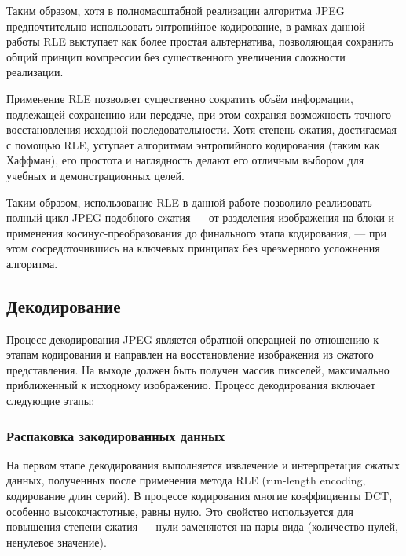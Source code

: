 Таким образом, хотя в полномасштабной реализации алгоритма JPEG предпочтительно использовать энтропийное кодирование, 
в рамках данной работы RLE выступает как более простая альтернатива, 
позволяющая сохранить общий принцип компрессии без существенного увеличения сложности реализации.


\begin{RLETable}
\end{RLETable}


\begin{RLEEncodedTable}
\end{RLEEncodedTable}


Применение RLE позволяет существенно сократить объём информации, подлежащей сохранению или передаче, 
при этом сохраняя возможность точного восстановления исходной последовательности. 
Хотя степень сжатия, достигаемая с помощью RLE, уступает алгоритмам энтропийного кодирования (таким как Хаффман), 
его простота и наглядность делают его отличным выбором для учебных и демонстрационных целей.

Таким образом, использование RLE в данной работе позволило реализовать полный цикл JPEG-подобного сжатия — от разделения изображения 
на блоки и применения косинус-преобразования до финального этапа кодирования, — при этом сосредоточившись на ключевых принципах без 
чрезмерного усложнения алгоритма.



\subsection{Декодирование}

Процесс декодирования JPEG является обратной операцией по отношению к этапам кодирования
и направлен на восстановление изображения из сжатого представления. 
На выходе должен быть получен массив пикселей, максимально приближенный к исходному изображению. 
Процесс декодирования включает следующие этапы:

 
\subsubsection{Распаковка закодированных данных}

На первом этапе декодирования выполняется извлечение и интерпретация сжатых данных, 
полученных после применения метода RLE (run-length encoding, кодирование длин серий). 
В процессе кодирования многие коэффициенты DCT, особенно высокочастотные, равны нулю. 
Это свойство используется для повышения степени сжатия — нули заменяются на пары вида (количество нулей, ненулевое значение).

